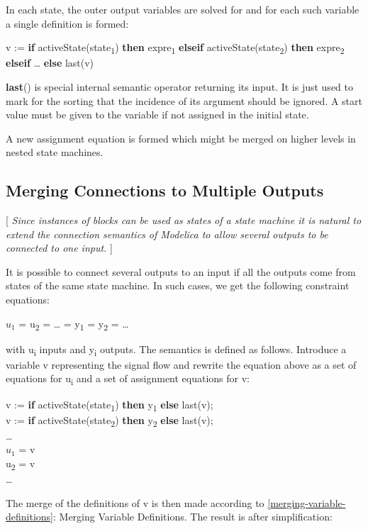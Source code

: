 \documentclass[10pt,a4paper]{report}
\def\doublelabel#1{\label{#1}\hypertarget{#1}{}}
\begin{document}
In each state, the outer output variables are solved for and for each
such variable a single definition is formed:

v := \textbf{if} activeState(state\textsubscript{1}) \textbf{then}
expre\textsubscript{1} \textbf{elseif}
activeState(state\textsubscript{2}) \textbf{then} expre\textsubscript{2}
\textbf{elseif} \ldots{} \textbf{else} last(v)

\textbf{last}() is special internal semantic operator returning its
input. It is just used to mark for the sorting that the incidence of its
argument should be ignored. A start value must be given to the variable
if not assigned in the initial state.

A new assignment equation is formed which might be merged on higher
levels in nested state machines.

\subsection{Merging Connections to Multiple Outputs}\doublelabel{merging-connections-to-multiple-outputs}

{[} \emph{Since instances of blocks can be used as states of a state
machine it is natural to extend the connection semantics of Modelica to
allow several outputs to be connected to one input.} {]}

It is possible to connect several outputs to an input if all the outputs
come from states of the same state machine. In such cases, we get the
following constraint equations:

$u_1$ = u\textsubscript{2} = \ldots{} = y\textsubscript{1}
= y\textsubscript{2} = \ldots{}

with u\textsubscript{i} inputs and y\textsubscript{i} outputs. The
semantics is defined as follows. Introduce a variable v representing the
signal flow and rewrite the equation above as a set of equations for
u\textsubscript{i} and a set of assignment equations for v:

v := \textbf{if} activeState(state\textsubscript{1}) \textbf{then}
y\textsubscript{1} \textbf{else} last(v);\\
v := \textbf{if} activeState(state\textsubscript{2}) \textbf{then}
y\textsubscript{2} \textbf{else} last(v);\\
\ldots{}\\
$u_1$ = v\\
u\textsubscript{2} = v\\
\ldots{}

The merge of the definitions of v is then made according to \ref{merging-variable-definitions}: 
Merging Variable Definitions. The result is after
simplification:
\end{document}
